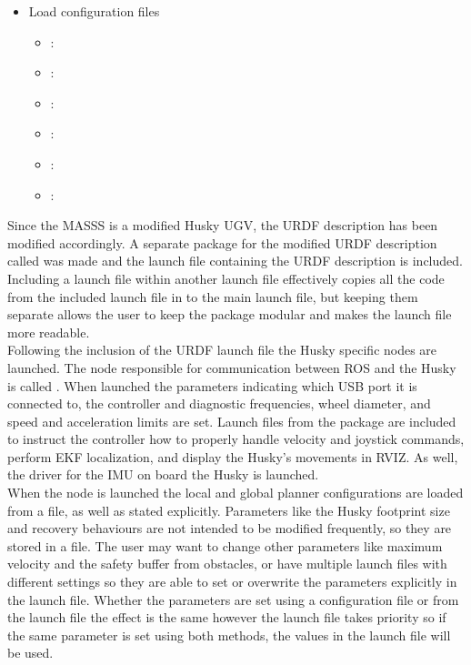 \begin{itemize}
\begin{itemize}
\end{itemize}

\item Load configuration files

\begin{itemize}

\item {} : 
\item {} : 
\item {} : 
\item {} : 
\item {} : 
\item {} : 
\end{itemize}

\end{itemize}

Since the MASSS is a modified Husky UGV, the URDF description has been modified accordingly. A separate package for the modified URDF description called  was made and the launch file containing the URDF description is included. Including a launch file within another launch file effectively copies all the code from the included launch file in to the main launch file, but keeping them separate allows the user to keep the package modular and makes the launch file more readable.\\

Following the inclusion of the URDF launch file the Husky specific nodes are launched. The node responsible for communication between ROS and the Husky is called . When launched the parameters indicating which USB port it is connected to, the controller and diagnostic frequencies, wheel diameter, and speed and acceleration limits are set. Launch files from the  package are included to instruct the controller how to properly handle  velocity and joystick commands, perform EKF localization, and display the Husky's movements in RVIZ. As well, the driver for the IMU on board the Husky is launched.\\

When the  node is launched the local and global planner configurations are loaded from a file, as well as stated explicitly. Parameters like the Husky footprint size and recovery behaviours are not intended to be modified frequently, so they are stored in a file. The user may want to change other parameters like maximum velocity and the safety buffer from obstacles, or have multiple launch files with different settings so they are able to set or overwrite the parameters explicitly in the launch file. Whether the parameters are set using a configuration file or from the launch file the effect is the same however the launch file takes priority so if the same parameter is set using both methods, the values in the launch file will be used.\\

